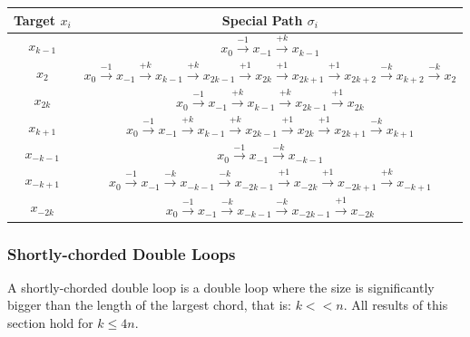  
\begin{center}
  \begin{tabular}{|c|c|}
 \hline
 Target $x_i$ & Special Path $\sigma_i$\\
 \hline
  $x_{k-1}$ &  $x_{0}\xrightarrow {-1}x_{-1}\xrightarrow {+k}x_{k-1}$\\
  $x_2$ & $x_{0} \xrightarrow {-1} x_{-1} \xrightarrow {+k} x_{k-1} \xrightarrow {+k} x_{2k-1} \xrightarrow {+1} x_{2k}  \xrightarrow {+1} x_{2k+1} \xrightarrow {+1} x_{2k+2} \xrightarrow {-k} x_{k+2} \xrightarrow {-k} x_{2}$\\
$x_{2k}$ &   $ x_{0} \xrightarrow {-1} x_{-1} \xrightarrow {+k} x_{k-1} \xrightarrow {+k} x_{2k-1} \xrightarrow {+1}  x_{2k}$\\
 $x_{k+1}$ & $ x_{0} \xrightarrow {-1} x_{-1} \xrightarrow {+k} x_{k-1} \xrightarrow {+k} x_{2k-1}
 \xrightarrow {+1}  x_{2k}\xrightarrow {+1} x_{2k+1} \xrightarrow {-k} x_{k+1}$\\
 $x_{-k-1}$ & $ x_{0} \xrightarrow {-1} x_{-1} \xrightarrow {-k} x_{-k-1}$\\
$x_{-k+1}$ & $ x_{0} \xrightarrow {-1} x_{-1} \xrightarrow {-k} x_{-k-1} \xrightarrow {-k} x_{-2k-1} \xrightarrow {+1} x_{-2k} \xrightarrow {+1} x_{-2k+1} \xrightarrow {+k} x_{-k+1}$\\
 $x_{-2k}$  & $x_{0} \xrightarrow {-1} x_{-1} \xrightarrow {-k} x_{-k-1} \xrightarrow {-k} x_{-2k-1} \xrightarrow {+1} x_{-2k}$\\
 \hline
 \end{tabular}
 \end{center}
 
 
\subsubsection {Shortly-chorded Double Loops}
\label{sec:shortly}

A shortly-chorded  double loop is a double loop where the size is significantly bigger than the length of the largest chord, that is:
  $k << n$. 
  All results of this section hold for $k \leq 4n$.



